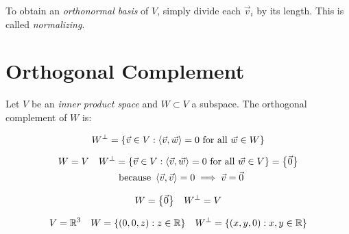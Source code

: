 \begin{remark}
  To obtain an \emph{orthonormal basis} of $V$, simply divide each $\vec v_i$ by its length.
  This is called \emph{normalizing}.
\end{remark}


\section{Orthogonal Complement}

\begin{definition}
  Let $V$ be an \emph{inner product space} and $W \subset V$ a subspace. The orthogonal complement of $W$ is:

  $$W^\perp = \left\{\vec v \in V : \left\langle \vec v , \vec w \right\rangle = 0 \text{ for all } \vec w \in W\right\}$$
\end{definition}

\begin{defexample}
  \begin{align*}
    W &= V & W^\perp &= \left\{\vec v \in V : \left\langle \vec v , \vec w \right\rangle = 0 \text{ for all } \vec w \in V\right\} = \left\{\vec 0\right\} \\
      &    &         &\text{ because } \left\langle \vec v , \vec v \right\rangle = 0 \implies \vec v = \vec 0
  \end{align*}
\end{defexample}

\begin{defexample}
  \begin{align*}
    W &= \left\{\vec 0\right\} & W^\perp = V
  \end{align*}
\end{defexample}

\begin{defexample}
  \begin{align*}
    V &= \mathbb{R}^3 & W &= \left\{(0,0,z) : z \in \mathbb{R}\right\} & W^\perp = \left\{(x,y,0) : x,y \in \mathbb{R}\right\}
  \end{align*}
\end{defexample}
